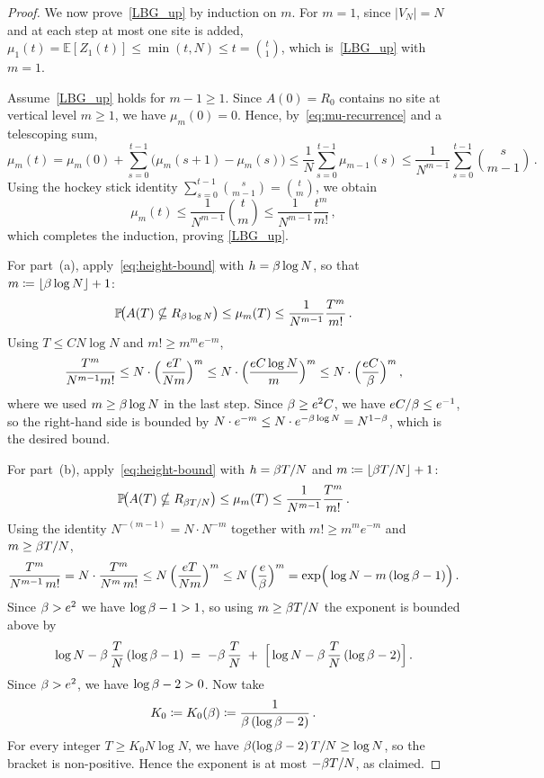 \documentclass[11pt,a4paper,reqno]{amsart}
\theoremstyle{definition}
\newcommand{\bbE}{{\ensuremath{\mathbb E}} }
\newcommand{\bbP}{{\ensuremath{\mathbb P}} }
\let\m=\mu   \let\n=\nu   \let\o=\omega    \let\p=\pi  \let\ph=\varphi
\begin{document}
\begin{proof}
We now prove~\eqref{LBG_up} by induction on $m$. For $m = 1$, since $|V_N| = N$ and at each step at most one site is added, $\m_1(t) = \bbE[Z_1(t)] \leq \min(t, N) \leq t = \binom{t}{1}$, which is~\eqref{LBG_up} with $m = 1$.

Assume~\eqref{LBG_up} holds for $m - 1 \geq 1$. Since $A(0) = R_0$ contains no site at vertical level $m \geq 1$, we have $\m_m(0) = 0$. Hence, by~\eqref{eq:mu-recurrence} and a telescoping sum,
	\[ \m_m(t) = \m_m(0) + \sum_{s=0}^{t-1} \big( \m_m(s+1) - \m_m(s) \big)
	\leq \frac{1}{N} \sum_{s=0}^{t-1} \m_{m-1}(s)
	\leq \frac{1}{N^{m-1}} \sum_{s=0}^{t-1} \binom{s}{m-1}\,. \]
Using the hockey stick identity $\sum_{s=0}^{t-1} \binom{s}{m-1} = \binom{t}{m}$, we obtain
	\[ \m_m(t) \leq \frac{1}{N^{m-1}} \binom{t}{m} \leq \frac{1}{N^{m-1}} \frac{t^m}{m!}\,, \]
which completes the induction, proving \eqref{LBG_up}.

For part~(a), apply~\eqref{eq:height-bound} with $h = \beta \log N$, so that $m \coloneqq \lfloor \beta \log N \rfloor + 1$:
	\[ \bbP\!\big( A(T) \nsubseteq R_{\b\log N} \big) \leq \m_m(T) \leq \frac{1}{N^{m-1}} \frac{T^m}{m!}\,. \]
Using $T \leq CN\log N$ and $m! \geq m^m e^{-m}$,
	\[ \frac{T^m}{N^{m-1} m!} \leq N \cdot \Big( \frac{eT}{Nm} \Big)^m
	\leq N \cdot \Big( \frac{eC \log N}{m} \Big)^m
	\leq N \cdot \Big( \frac{eC}{\beta} \Big)^m\,, \]
where we used $m \geq \beta \log N$ in the last step. Since $\beta \geq e^2 C$, we have $eC/\beta \leq e^{-1}$, so the right-hand side is bounded by $N \cdot e^{-m} \leq N \cdot e^{-\beta\log N} = N^{1 - \beta}$, which is the desired bound.

For part~(b), apply~\eqref{eq:height-bound} with $h = \beta T/N$ and $m \coloneqq \lfloor \beta T/N \rfloor + 1$:
	\[ \bbP\!\big( A(T) \nsubseteq R_{\b T/N} \big) \leq \m_m(T) \leq \frac{1}{N^{m-1}} \frac{T^m}{m!}\,. \]
Using the identity $N^{-(m-1)} = N \cdot N^{-m}$ together with $m! \geq m^m e^{-m}$ and $m \geq \beta T/N$,
	\[ \frac{T^m}{N^{m-1}\, m!}
	= N \cdot \frac{T^m}{N^m\, m!}
	\leq N\, \Big(\frac{e T}{Nm}\Big)^m
	\leq N\, \Big(\frac{e}{\beta}\Big)^m
	= \exp\!\Big( \log N - m\,(\log\beta - 1) \Big)\,. \]
Since $\beta > e^2$ we have $\log\beta - 1 > 1$, so using $m \geq \beta T/N$ the exponent is bounded above by
	\[
	\log N - \beta\,\frac{T}{N}\,(\log\beta - 1)
	\;=\; -\beta\,\frac{T}{N} \;+\; \Big[\log N - \beta\,\frac{T}{N}\,(\log\beta - 2)\Big]\,.
	\]
Since $\beta > e^2$, we have $\log\beta - 2 > 0$. Now take
\[
  K_0 \coloneqq K_0(\beta) \coloneqq \frac{1}{\beta\,(\log\beta - 2)}\,.
\]
For every integer $T \geq K_0 N\log N$, we have $\beta(\log\beta - 2)\,T/N \geq \log N$, so the bracket is non-positive. Hence the exponent is at most $-\beta T/N$, as claimed.
\end{proof}
\end{document}

